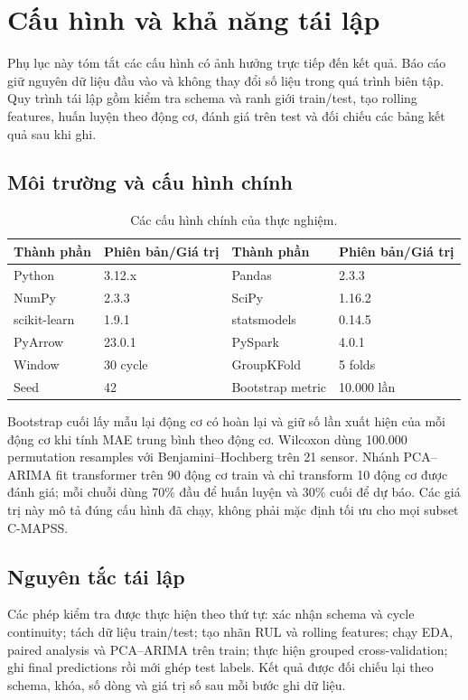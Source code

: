 \section{Cấu hình và khả năng tái lập}

Phụ lục này tóm tắt các cấu hình có ảnh hưởng trực tiếp đến kết quả. Báo cáo
giữ nguyên dữ liệu đầu vào và không thay đổi số liệu trong quá trình biên tập.
Quy trình tái lập gồm kiểm tra schema và ranh giới train/test, tạo rolling
features, huấn luyện theo động cơ, đánh giá trên test và đối chiếu các bảng kết
quả sau khi ghi.

\subsection{Môi trường và cấu hình chính}

\begin{table}[H]
\centering
\caption[Cấu hình thực nghiệm]{Các cấu hình chính của thực nghiệm.}
\label{tab:environment}
\begin{tabular}{ll@{\qquad}ll}
\toprule
Thành phần & Phiên bản/Giá trị & Thành phần & Phiên bản/Giá trị \\\midrule
Python & 3.12.x & Pandas & 2.3.3 \\
NumPy & 2.3.3 & SciPy & 1.16.2 \\
scikit-learn & 1.9.1 & statsmodels & 0.14.5 \\
PyArrow & 23.0.1 & PySpark & 4.0.1 \\
Window & 30 cycle & GroupKFold & 5 folds \\
Seed & 42 & Bootstrap metric & 10.000 lần \\
\bottomrule
\end{tabular}
\end{table}

Bootstrap cuối lấy mẫu lại động cơ có hoàn lại và giữ số lần xuất hiện của mỗi
động cơ khi tính MAE trung bình theo động cơ. Wilcoxon dùng 100.000 permutation
resamples với Benjamini--Hochberg trên 21 sensor. Nhánh PCA--ARIMA fit
transformer trên 90 động cơ train và chỉ transform 10 động cơ được đánh giá; mỗi
chuỗi dùng 70\% đầu để huấn luyện và 30\% cuối để dự báo. Các giá trị này mô tả đúng
cấu hình đã chạy, không phải mặc định tối ưu cho mọi subset C-MAPSS.

\subsection{Nguyên tắc tái lập}

Các phép kiểm tra được thực hiện theo thứ tự: xác nhận schema và cycle
continuity; tách dữ liệu train/test; tạo nhãn RUL và rolling features; chạy
EDA, paired analysis và PCA--ARIMA trên train; thực hiện grouped
cross-validation; ghi final predictions rồi mới ghép test labels. Kết quả được
đối chiếu lại theo schema, khóa, số dòng và giá trị số sau mỗi bước ghi dữ liệu.


